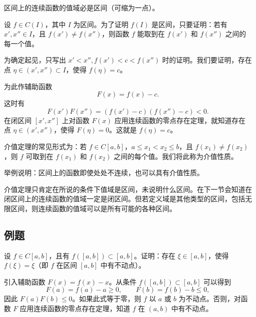 \begin{xproposition}[5.2.2（介值定理）]
区间上的连续函数的值域必是区间（可缩为一点）。
\end{xproposition}
\begin{xproof}
设 $f\in C(I)$，其中 $I$ 为区间。为了证明 $f(I)$ 是区间，只要证明：若有 $x',x''\in I$，且 $f(x')\ne f(x'')$，则函数 $f$ 能取到在 $f(x')$ 和 $f(x'')$ 之间的每一个值。

为确定起见，只写出 $x'<x'',f(x')<c<f(x'')$ 时的证明。我们要证明，存在点 $\eta\in(x',x'')\subset I$，使得 $f(\eta)=c$。

为此作辅助函数
\[
  F(x)=f(x)-c.
\]
这时有
\[
  F(x')F(x'')=(f(x')-c)(f(x'')-c)<0.
\]
在闭区间 $[x',x'']$ 上对函数 $F(x)$ 应用连续函数的零点存在定理，就知道存在点 $\eta\in(x',x'')$，使得 $F(\eta)=0$。这就是 $f(\eta)=c$。
\end{xproof}

\begin{xremark}
介值定理的常见形式为：若 $f\in C[a,b]$，$a\le x_1<x_2\le b$，且 $f(x_1)\ne f(x_2)$，则 $f$ 可取到在 $f(x_1)$ 和 $f(x_2)$ 之间的每个值。我们将此称为介值性质。
\end{xremark}

\begin{xthought}
举例说明：区间上的函数即使处处不连续，也可以具有介值性质。
\end{xthought}

\begin{xremark}
介值定理只肯定在所说的条件下值域是区间，未说明什么区间。在下一节会知道在闭区间上的连续函数的值域一定是闭区间。但若定义域是其他类型的区间，包括无限区间，则连续函数的值域可以是所有可能的各种区间。
\end{xremark}

\subsection{例题}

\begin{xexample}[5.2.4]
设 $f\in C[a,b]$，且有 $f([a,b])\subset[a,b]$。证明：存在 $\xi\in[a,b]$，使得 $f(\xi)=\xi$（即 $f$ 在区间 $[a,b]$ 中有不动点）。
\end{xexample}
\begin{xproof}
引入辅助函数 $F(x)=f(x)-x$。从条件 $f([a,b])\subset[a,b]$ 可以得到
\[
  F(a)=f(a)-a\ge0,\qquad F(b)=f(b)-b\le0,
\]
因此 $F(a)F(b)\le0$。如果此式等于零，则 $f$ 以 $a$ 或 $b$ 为不动点。否则，对函数 $F$ 应用连续函数的零点存在定理，知道 $f$ 在 $(a,b)$ 中有不动点。
\end{xproof}

